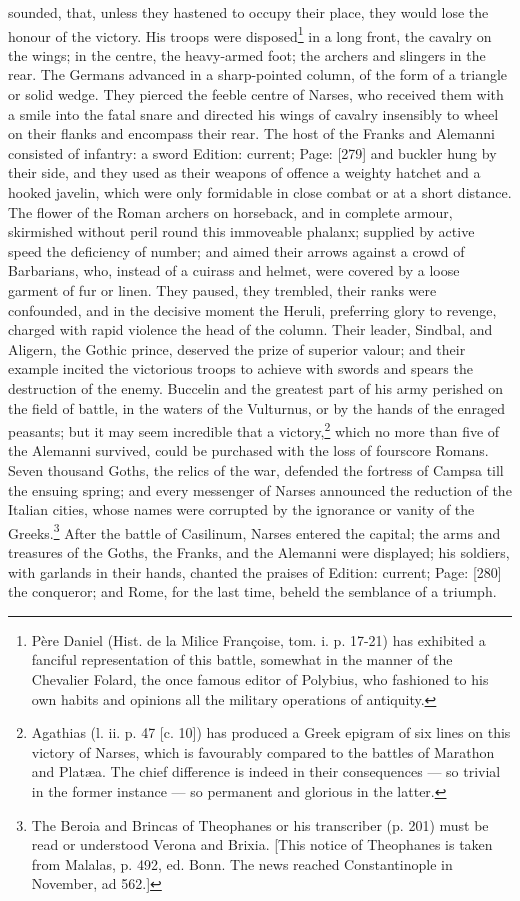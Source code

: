sounded, that, unless they hastened to occupy their place, they would lose the honour of the victory. His troops were disposed\footnote{Père Daniel (Hist. de la Milice Françoise, tom. i. p. 17-21) has exhibited a fanciful representation of this battle, somewhat in the manner of the Chevalier Folard, the once famous editor of Polybius, who fashioned to his own habits and opinions all the military operations of antiquity.} in a long front, the cavalry on the wings; in the centre, the heavy-armed foot; the archers and slingers in the rear. The Germans advanced in a sharp-pointed column, of the form of a triangle or solid wedge. They pierced the feeble centre of Narses, who received them with a smile into the fatal snare and directed his wings of cavalry insensibly to wheel on their flanks and encompass their rear. The host of the Franks and Alemanni consisted of infantry: a sword Edition: current; Page: [279] and buckler hung by their side, and they used as their weapons of offence a weighty hatchet and a hooked javelin, which were only formidable in close combat or at a short distance. The flower of the Roman archers on horseback, and in complete armour, skirmished without peril round this immoveable phalanx; supplied by active speed the deficiency of number; and aimed their arrows against a crowd of Barbarians, who, instead of a cuirass and helmet, were covered by a loose garment of fur or linen. They paused, they trembled, their ranks were confounded, and in the decisive moment the Heruli, preferring glory to revenge, charged with rapid violence the head of the column. Their leader, Sindbal, and Aligern, the Gothic prince, deserved the prize of superior valour; and their example incited the victorious troops to achieve with swords and spears the destruction of the enemy. Buccelin and the greatest part of his army perished on the field of battle, in the waters of the Vulturnus, or by the hands of the enraged peasants; but it may seem incredible that a victory,\footnote{Agathias (l. ii. p. 47 [c. 10]) has produced a Greek epigram of six lines on this victory of Narses, which is favourably compared to the battles of Marathon and Platæa. The chief difference is indeed in their consequences \texthebrew{—} so trivial in the former instance \texthebrew{—} so permanent and glorious in the latter.} which no more than five of the Alemanni survived, could be purchased with the loss of fourscore Romans. Seven thousand Goths, the relics of the war, defended the fortress of Campsa till the ensuing spring; and every messenger of Narses announced the reduction of the Italian cities, whose names were corrupted by the ignorance or vanity of the Greeks.\footnote{The Beroia and Brincas of Theophanes or his transcriber (p. 201) must be read or understood Verona and Brixia. [This notice of Theophanes is taken from Malalas, p. 492, ed. Bonn. The news reached Constantinople in November, ad 562.]} After the battle of Casilinum, Narses entered the capital; the arms and treasures of the Goths, the Franks, and the Alemanni were displayed; his soldiers, with garlands in their hands, chanted the praises of Edition: current; Page: [280] the conqueror; and Rome, for the last time, beheld the semblance of a triumph.

